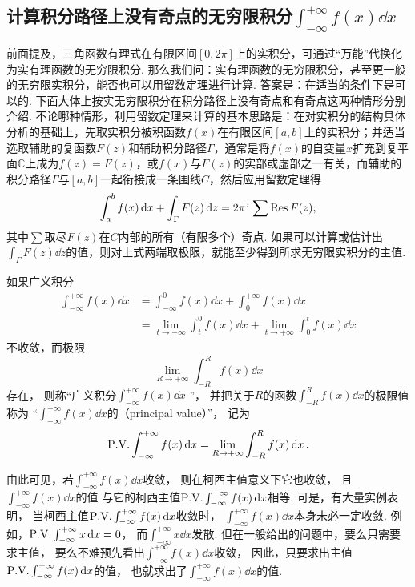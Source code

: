 \subsection{计算积分路径上没有奇点的无穷限积分\texorpdfstring{\(\int_{-\infty}^{+\infty} f(x) \dd{x}\)}{}}
前面提及，三角函数有理式在有限区间\([0,2\pi]\)上的实积分，可通过“万能”代换化为实有理函数的无穷限积分.
那么我们问：实有理函数的无穷限积分，甚至更一般的无穷限实积分，能否也可以用留数定理进行计算.
答案是：在适当的条件下是可以的.
下面大体上按实无穷限积分在积分路径上没有奇点和有奇点这两种情形分别介绍.
不论哪种情形，利用留数定理来计算的基本思路是：在对实积分的结构具体分析的基础上，先取实积分被积函数\(f(x)\)在有限区间\([a,b]\)上的实积分；并适当选取辅助的复函数\(F(z)\)和辅助积分路径\(\Gamma\)，通常是将\(f(x)\)的自变量\(x\)扩充到复平面\(\mathbb{C}\)上成为\(f(z)=F(z)\)，或\(f(x)\)与\(F(z)\)的实部或虚部之一有关，而辅助的积分路径\(\Gamma\)与\([a,b]\)一起衔接成一条围线\(C\)，然后应用留数定理得\begin{equation}
\int_a^b f(x) \dd{x}
+ \int_\Gamma F(z) \dd{z}
= 2\pi\kern1pt\mathrm{i}\kern1pt \sum \operatorname{Res} F(z),
\end{equation}
其中\(\sum\)取尽\(F(z)\)在\(C\)内部的所有（有限多个）奇点.
如果可以计算或估计出\(\int_\Gamma F(z) \dd{z}\)的值，则对上式两端取极限，就能至少得到所求无穷限实积分的主值.

如果广义积分\begin{align*}
\int_{-\infty}^{+\infty} f(x) \dd{x}
&= \int_{-\infty}^0 f(x) \dd{x} + \int_0^{+\infty} f(x) \dd{x} \\
&= \lim\limits_{t \to -\infty} \int_t^0 f(x) \dd{x}
	+ \lim\limits_{t \to +\infty} \int_0^t f(x) \dd{x}
\end{align*}
不收敛，而极限\[
\lim\limits_{R\to+\infty} \int_{-R}^R f(x) \dd{x}
\]存在，
则称“广义积分\(\int_{-\infty}^{+\infty} f(x) \dd{x}\) ”，
并把关于\(R\)的函数\(\int_{-R}^R f(x) \dd{x}\)的极限值称为%
“\(\int_{-\infty}^{+\infty} f(x) \dd{x}\)的（principal value）”，
记为\[
	\pvint f(x) \dd{x}
	= \lim\limits_{R\to+\infty} \int_{-R}^R f(x) \dd{x}.
\]

由此可见，若\(\int_{-\infty}^{+\infty} f(x) \dd{x}\)收敛，
则在柯西主值意义下它也收敛，
且\(\int_{-\infty}^{+\infty} f(x) \dd{x}\)的值
与它的柯西主值\(\pvint f(x) \dd{x}\)相等.
可是，有大量实例表明，
当柯西主值\(\pvint f(x) \dd{x}\)收敛时，
\(\int_{-\infty}^{+\infty} f(x) \dd{x}\)本身未必一定收敛.
例如，\(\pvint x \dd{x} = 0\)，
而\(\int_{-\infty}^{+\infty} x \dd{x}\)发散.
但在一般给出的问题中，要么只需要求主值，
要么不难预先看出\(\int_{-\infty}^{+\infty} f(x) \dd{x}\)收敛，
因此，只要求出主值\(\pvint f(x) \dd{x}\)的值，
也就求出了\(\int_{-\infty}^{+\infty} f(x) \dd{x}\)的值.

